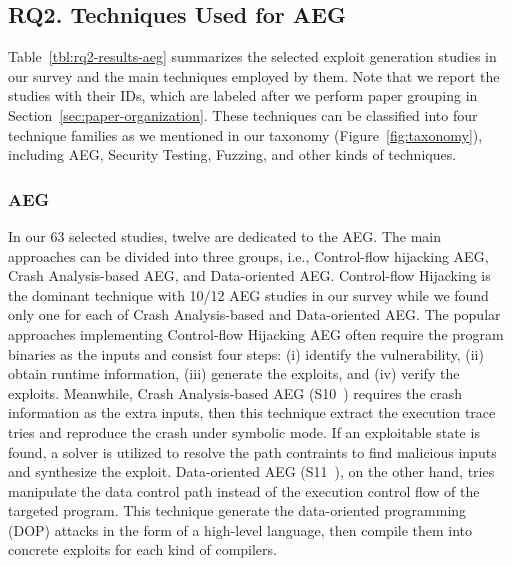 \subsection{RQ2. Techniques Used for AEG}

Table~\ref{tbl:rq2-results-aeg} summarizes the selected exploit generation studies in our survey and the main techniques employed by them.
Note that we report the studies with their IDs, which are labeled after we perform paper grouping in Section~\ref{sec:paper-organization}.
These techniques can be classified into four technique families as we mentioned in our taxonomy (Figure~\ref{fig:taxonomy}), including AEG, Security Testing, Fuzzing, and other kinds of techniques.



\subsubsection{AEG}
In our 63 selected studies, twelve are dedicated to the AEG. The main approaches can be divided into three groups, i.e., Control-flow hijacking AEG, Crash Analysis-based AEG, and Data-oriented AEG. Control-flow Hijacking is the dominant technique with 10/12 AEG studies in our survey while we found only one for each of Crash Analysis-based and Data-oriented AEG. The popular approaches implementing Control-flow Hijacking AEG often require the program binaries as the inputs and consist four steps: (i) identify the vulnerability, (ii) obtain runtime information, (iii) generate the exploits, and (iv) verify the exploits. Meanwhile, Crash Analysis-based AEG (S10~\cite{Liu202271}) requires the crash information as the extra inputs, then this technique extract the execution trace tries and reproduce the crash under symbolic mode. If an exploitable state is found, a solver is utilized to resolve the path contraints to find malicious inputs and synthesize the exploit. Data-oriented AEG (S11~\cite{Pewny2019111}), on the other hand, tries manipulate the data control path instead of the execution control flow of the targeted program. This technique generate the data-oriented programming (DOP) attacks in the form of a high-level language, then compile them into concrete exploits for each kind of compilers.

